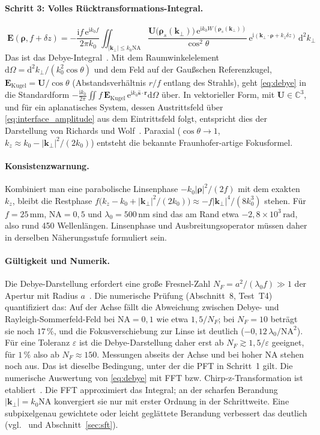 \documentclass[11pt,a4paper]{scrartcl}
\theoremstyle{insightstyle}
\newcommand{\dd}{\mathrm{d}}
\newcommand{\ii}{\mathrm{i}}
\newcommand{\ee}{\mathrm{e}}
\newcommand{\rh}{\bm{\rho}}
\newcommand{\kp}{\bm{k}_\perp}
\newcommand{\NA}{\mathrm{NA}}
\begin{document}
\paragraph{Schritt 3: Volles Rücktransformations-Integral.}
\begin{equation}
    \boxed{\;\bm E(\rh,f+\delta z) = -\frac{\ii f\,\ee^{\ii k_0f}}{2\pi k_0}\iint_{|\kp|\le k_0\NA}\frac{\bm U\big(\rh_s(\kp)\big)\,\ee^{\ii k_0W(\rh_s(\kp))}}{\cos^2\theta}\,\ee^{\ii(\kp\cdot\rh+k_z\delta z)}\,\dd^2k_\perp\;}
    \label{eq:debye}
\end{equation}
Das ist das Debye-Integral~\cite{bornwolf1999,stamnes1986}. Mit dem Raumwinkelelement $\dd\Omega=\dd^2k_\perp/(k_0^2\cos\theta)$ und dem Feld auf der Gaußschen Referenzkugel, $\bm E_\text{Kugel}=\bm U/\cos\theta$ (Abstandsverhältnis $r/f$ entlang des Strahls), geht \eqref{eq:debye} in die Standardform $-\frac{\ii k_0}{2\pi}\iint f\,\bm E_\text{Kugel}\,\ee^{\ii k_0\hat{\bm s}\cdot\bm r}\dd\Omega$ über. In vektorieller Form, mit $\bm U\in\mathbb C^3$, und für ein aplanatisches System, dessen Austrittsfeld über \eqref{eq:interface_amplitude} aus dem Eintrittsfeld folgt, entspricht dies der Darstellung von Richards und Wolf~\cite{wolf1959,richards1959}. Paraxial ($\cos\theta\to1$, $k_z\approx k_0-|\kp|^2/(2k_0)$) entsteht die bekannte Fraunhofer-artige Fokusformel.

\paragraph{Konsistenzwarnung.} Kombiniert man eine parabolische Linsenphase $-k_0|\rh|^2/(2f)$ mit dem exakten $k_z$, bleibt die Restphase $f\big(k_z-k_0+|\kp|^2/(2k_0)\big)\approx-f|\kp|^4/(8k_0^3)$ stehen. Für $f=25\,\text{mm}$, $\NA=0{,}5$ und $\lambda_0=500\,\text{nm}$ sind das am Rand etwa $-2{,}8\times10^3\,\text{rad}$, also rund 450 Wellenlängen. Linsenphase und Ausbreitungsoperator müssen daher in derselben Näherungsstufe formuliert sein.

\paragraph{Gültigkeit und Numerik.} Die Debye-Darstellung erfordert eine große Fresnel-Zahl $N_F=a^2/(\lambda_0f)\gg1$ der Apertur mit Radius $a$~\cite{wolfli1981}. Die numerische Prüfung (Abschnitt~8, Test~T4) quantifiziert das: Auf der Achse fällt die Abweichung zwischen Debye- und Rayleigh-Sommerfeld-Feld bei $\NA=0{,}1$ wie etwa $1{,}5/N_F$; bei $N_F=10$ beträgt sie noch $17\,\%$, und die Fokusverschiebung zur Linse ist deutlich ($-0{,}12\,\lambda_0/\NA^2$). Für eine Toleranz $\varepsilon$ ist die Debye-Darstellung daher erst ab $N_F\gtrsim1{,}5/\varepsilon$ geeignet, für $1\,\%$ also ab $N_F\approx150$. Messungen abseits der Achse und bei hoher NA stehen noch aus. Das ist dieselbe Bedingung, unter der die PFT in Schritt~1 gilt. Die numerische Auswertung von \eqref{eq:debye} mit FFT bzw. Chirp-z-Transformation ist etabliert~\cite{leutenegger2006}. Die FFT approximiert das Integral; an der scharfen Berandung $|\kp|=k_0\NA$ konvergiert sie nur mit erster Ordnung in der Schrittweite. Eine subpixelgenau gewichtete oder leicht geglättete Berandung verbessert das deutlich (vgl.~\cite{leutenegger2006} und Abschnitt~\ref{sec:sft}).
\end{document}
